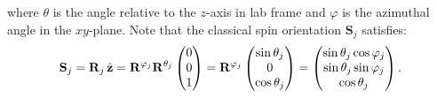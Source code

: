 where $\theta$ is the angle relative to the $z$-axis in lab frame and $\varphi$ is the azimuthal angle in the $xy$-plane.
Note that the classical spin orientation $\mathbf{S}_j$ satisfies:
\begin{equation}
    \mathbf{S}_{j} 
    = \mathbf{R}_{j} \, \hat{\bf z} 
    = \mathbf{R}^{\varphi_{j}} \mathbf{R}^{\theta_{j}} 
    \begin{pmatrix} 
        0 \\ 0 \\ 1 
    \end{pmatrix} 
    = \mathbf{R}^{\varphi_j} 
    \begin{pmatrix} 
        \sin \theta_{j} \\ 0 \\ \cos \theta_{j} 
    \end{pmatrix} 
    = 
    \begin{pmatrix} 
        \sin \theta_{j} \cos \varphi_{j} \\ \sin \theta_{j} \sin \varphi_{j} \\ \cos \theta_{j} 
    \end{pmatrix}.
\end{equation}




